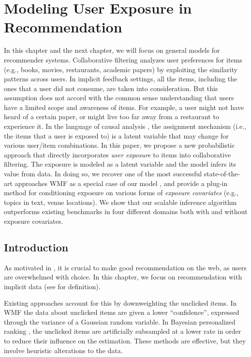 

\chapter{Modeling User Exposure in Recommendation} \label{chpt:expomf}

In this chapter and the next chapter, we will focus on general models for recommender systems. 
Collaborative filtering analyzes user preferences for items (e.g., books,
movies, restaurants, academic papers) by exploiting the similarity patterns
across users. In implicit feedback settings, all the items, including the ones 
that a user did not consume, are taken into consideration. But this
assumption does not accord with the common sense understanding that users have
a limited scope and awareness of items. For example, a user might not have
heard of a certain paper, or might live too far away from a restaurant to
experience it. In the language of causal analysis \citep{imbens2015causal}, the
assignment mechanism (i.e., the items that a user is exposed to) is a latent
variable that may change for various user/item combinations. 
In this paper, we propose a new probabilistic approach that directly
incorporates \emph{user exposure} to items into collaborative filtering.
The exposure is modeled as a latent variable and the model infers its
value from data. In doing so, we recover one of the most successful
state-of-the-art approaches \gls{WMF} as a special case of our model
\citep{hu2008collaborative}, and provide a plug-in method for conditioning
exposure on various forms of \emph{exposure covariates} (e.g., topics in text,
venue locations). We show that our scalable inference algorithm
outperforms existing benchmarks in four different domains both with and
without exposure covariates.


\section{Introduction}
\label{chpt:expomf:sec:intro}

As motivated in , it is crucial to make good recommendation on the web, as users are overwhelmed with choice. In this chapter, we focus on recommendation with implicit data (see  for definition). 

Existing approaches account for this by downweighting the unclicked
items.  In \gls{WMF} \citep{hu2008collaborative} the data about unclicked items are given a
lower ``confidence'', expressed through the variance of a Gaussian
random variable.  In Bayesian personalized ranking \citep{rendle2009bpr}, the unclicked items are artificially
subsampled at a lower rate in order to reduce their influence on the
estimation.  These methods are effective, but they involve heuristic
alterations to the data.

